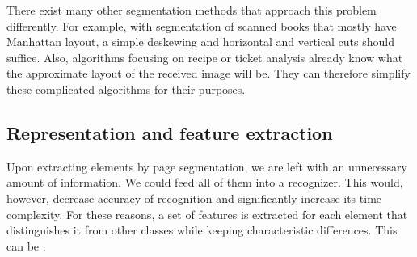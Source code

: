 There exist many other segmentation methods that approach this problem differently. For example, with segmentation of scanned books that mostly have Manhattan layout, a simple deskewing and horizontal and vertical cuts should suffice. Also, algorithms focusing on recipe or ticket analysis already know what the approximate layout of the received image will be. They can therefore simplify these complicated algorithms for their purposes.

\subsection{Representation and feature extraction}


Upon extracting elements by page segmentation, we are left with an unnecessary amount of information. We could feed all of them into a recognizer. This would, however, decrease accuracy of recognition and significantly increase its time complexity. For these reasons, a set of features is extracted for each element that distinguishes it from other classes while keeping characteristic differences. This can be  \citep{featureExtractionBook}.

